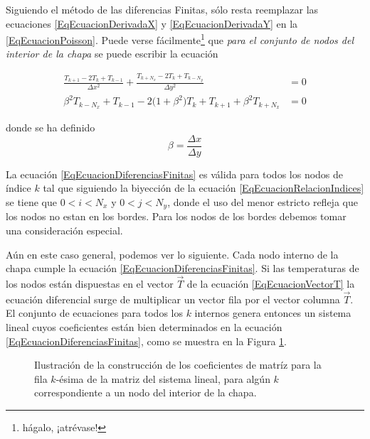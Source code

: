 Siguiendo el método de las diferencias Finitas, 
sólo resta reemplazar las ecuaciones \ref{EqEcuacionDerivadaX} 
y \ref{EqEcuacionDerivadaY} en la \ref{EqEcuacionPoisson}. Puede
verse fácilmente\footnote{hágalo, ¡atrévase!} que \emph{para el 
conjunto de nodos del interior de la chapa } se puede escribir
la ecuación

\begin{equation}\label{EqEcuacionDiferenciasFinitas}
  \begin{aligned}
    \frac{T_{k+1} - 2T_k +T_{k-1} }
    {\Delta x ^2}    
    +
    \frac{T_{k+N_x} - 2T_k +T_{k-N_y} }
    {\Delta y ^2}
    &= 0 \\
    \beta ^2 T_{k-N_x}+T_{k-1} 
    - 2\big(1+\beta^2\big) T_k
    +T_{k+1} + \beta^2 T_{k+N_x} &= 0
  \end{aligned}
\end{equation}

donde se ha definido 
\begin{equation}\label{EqEcuacionBeta}
  \beta = \frac{\Delta x}{\Delta y}
\end{equation}

La ecuación 
\ref{EqEcuacionDiferenciasFinitas}
es válida para todos los nodos de índice
$k$ tal que siguiendo la biyección de la
ecuación \ref{EqEcuacionRelacionIndices}
se tiene que $0<i<N_x$ y $0<j<N_y$, donde
el uso del menor estricto refleja que
los nodos no estan en los bordes. 
Para los
nodos de los bordes debemos tomar una 
consideración especial. 

Aún en este caso general, podemos ver 
lo siguiente. Cada nodo interno de la chapa
cumple la ecuación \ref{EqEcuacionDiferenciasFinitas}. Si las 
temperaturas de los nodos están dispuestas en
el vector $\vec{T}$ de la ecuación \ref{EqEcuacionVectorT}
la ecuación diferencial surge de multiplicar
un vector fila por el vector columna $\vec{T}$.
El conjunto de ecuaciones para todos los $k$
internos genera entonces un sistema lineal 
cuyos coeficientes están bien determinados 
en la ecuación \ref{EqEcuacionDiferenciasFinitas},
como se muestra en la Figura \ref{FiguraCoeficientesMatriz}.

\begin{figure}
  \caption{Ilustración de la construcción de los coeficientes de matríz
  para la fila $k$-ésima de la matriz del sistema lineal, para algún
  $k$ correspondiente a un nodo del interior de la chapa.
  \label{FiguraCoeficientesMatriz}}

\end{figure}
\mode*

